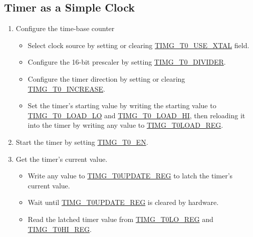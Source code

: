 \documentclass[main\_\_EN.tex]{subfiles}
\begin{document}
\subsection{Timer as a Simple Clock}\label{sec:timg-func-descr-simple-clock}
\begin{enumerate}
    \item Configure the time-base counter
    \begin{itemize}
        \item Select clock source by setting or clearing \hyperref[fielddesc:TIMGTXUSEXTAL]{TIMG\_T0\_USE\_XTAL} field.
        \item Configure the 16-bit prescaler by setting \hyperref[fielddesc:TIMGTXDIVIDER]{TIMG\_T0\_DIVIDER}.
        \item Configure the timer direction by setting or clearing \hyperref[fielddesc:TIMGTXINCREASE]{TIMG\_T0\_INCREASE}.
        \item Set the timer's starting value by writing the starting value to \hyperref[fielddesc:TIMGTXLOADLO]{TIMG\_T0\_LOAD\_LO} and \hyperref[fielddesc:TIMGTXLOADHI]{TIMG\_T0\_LOAD\_HI}, then reloading it into the timer by writing any value to \hyperref[regdesc:TIMGTXLOADREG]{TIMG\_T0LOAD\_REG}.
    \end{itemize}
    \item Start the timer by setting \hyperref[fielddesc:TIMGTXEN]{TIMG\_T0\_EN}.
    \item Get the timer's current value.
    \begin{itemize}
        \item  Write any value to \hyperref[regdesc:TIMGTXUPDATEREG]{TIMG\_T0UPDATE\_REG} to latch the timer's current value.
        \item Wait until \hyperref[regdesc:TIMGTXUPDATEREG]{TIMG\_T0UPDATE\_REG} is cleared by hardware.
        \item  Read the latched timer value from \hyperref[regdesc:TIMGTXLOREG]{TIMG\_T0LO\_REG} and \hyperref[regdesc:TIMGTXHIREG]{TIMG\_T0HI\_REG}.   
    \end{itemize}   
\end{enumerate}
\end{document}
